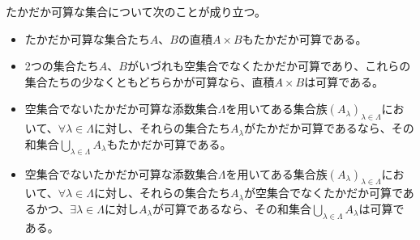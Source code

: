 \documentclass[dvipdfmx]{jsarticle}
\begin{document}
\begin{thm}\label{1.2.7.7}
たかだか可算な集合について次のことが成り立つ。
\begin{itemize}
\item
  たかだか可算な集合たち$A$、$B$の直積$A \times B$もたかだか可算である。
\item
  2つの集合たち$A$、$B$がいづれも空集合でなくたかだか可算であり、これらの集合たちの少なくともどちらかが可算なら、直積$A \times B$は可算である。
\item
  空集合でないたかだか可算な添数集合$\varLambda$を用いてある集合族$\left( A_{\lambda} \right)_{\lambda \in \varLambda}$において、$\forall\lambda \in \varLambda$に対し、それらの集合たち$A_{\lambda}$がたかだか可算であるなら、その和集合$\bigcup_{\lambda \in \varLambda} A_{\lambda}$もたかだか可算である。
\item
  空集合でないたかだか可算な添数集合$\varLambda$を用いてある集合族$\left( A_{\lambda} \right)_{\lambda \in \varLambda}$において、$\forall\lambda \in \varLambda$に対し、それらの集合たち$A_{\lambda}$が空集合でなくたかだか可算であるかつ、$\exists\lambda \in \varLambda$に対し$A_{\lambda}$が可算であるなら、その和集合$\bigcup_{\lambda \in \varLambda} A_{\lambda}$は可算である。
\end{itemize}
\end{thm}
\end{document}
